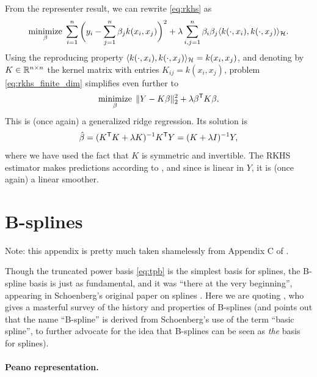 \documentclass{article}
\begin{document}
From the representer result, we can rewrite \eqref{eq:rkhs} as
\begin{equation}
\label{eq:rkhs_finite_dim}
\mathop{\mathrm{minimize}}_\beta \; \sum_{i=1}^n \bigg( y_i - \sum_{j=1}^n \beta_j k(x_i, x_j) 
\bigg)^2 + \lambda \sum_{i,j=1}^n \beta_i \beta_j \langle k(\cdot, x_i) ,
k(\cdot, x_j) \rangle_{\mathcal{H}}.
\end{equation}
Using the reproducing property $\langle k(\cdot, x_i), k(\cdot, x_j) \rangle_{\mathcal{H}}
= k(x_i, x_j)$, and denoting by $K \in \mathbb{R}^{n \times n}$ the kernel matrix with
entries $K_{ij} = k(x_i, x_j)$, problem \eqref{eq:rkhs_finite_dim} simplifies
even further to
\[
\mathop{\mathrm{minimize}}_\beta \; \|Y - K\beta\|_2^2 + \lambda \beta^{\mathsf{T}} K \beta.
\]
This is (once again) a generalized ridge regression. Its solution is
\[
\hat{\beta} = (K^{\mathsf{T}} K + \lambda K)^{-1} K^{\mathsf{T}} Y = (K + \lambda I)^{-1} Y,
\]
where we have used the fact that $K$ is symmetric and invertible. The RKHS
estimator makes predictions according to , and since \smash{$\hbeta$} is linear in $Y$, it is (once again) a
linear smoother. 




\clearpage
\appendix

\section{B-splines}
\label{app:bs}

Note: this appendix is pretty much taken shamelessly from Appendix C of 
\citet{tibshirani2022divided}.

Though the truncated power basis \eqref{eq:tpb} is the simplest basis for
splines, the B-spline basis is just as fundamental, and it was ``there at the 
very beginning'', appearing in Schoenberg's original paper on splines
\citep{schoenberg1946contributions1}. Here we are quoting
\citet{deboor1976splines}, who gives a masterful survey of the history and
properties of B-splines (and points out that the name ``B-spline'' is derived
from Schoenberg's use of the term ``basic spline'', to further advocate for the
idea that B-splines can be seen as \emph{the} basis for splines).

\paragraph{Peano representation.}

\def\st{^{\text{st}}}
\end{document}
